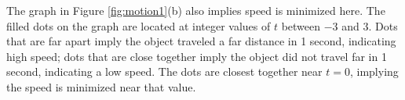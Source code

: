 {\begin{enumerate}
	The graph in Figure \ref{fig:motion1}(b) also implies speed is minimized here. The filled dots on the graph are located at integer values of $t$ between $-3$ and 3. Dots that are far apart imply the object traveled a far distance in 1 second, indicating high speed; dots that are close together imply the object did not travel far in 1 second, indicating a low speed. The dots are closest together near $t=0$, implying the speed is minimized near that value.
\end{enumerate}
\baselineskip
}\\

